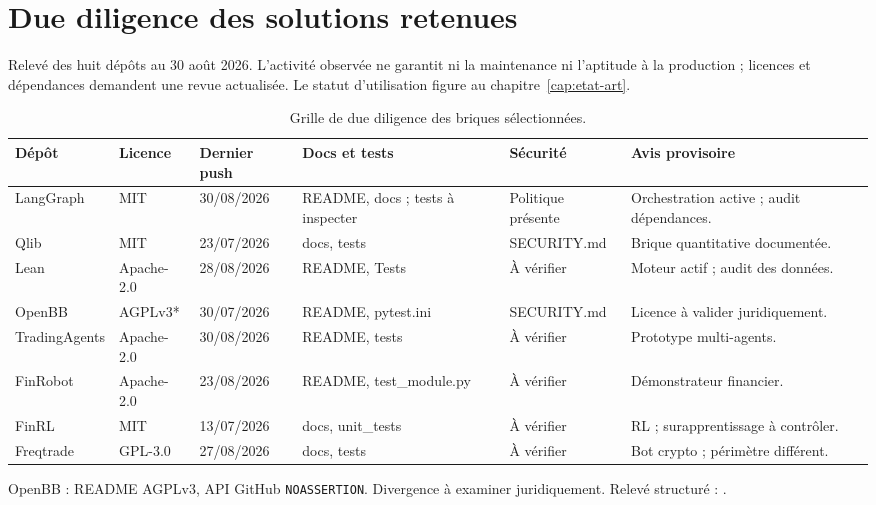 \chapter{Due diligence des solutions retenues}\label{annexe:github}

Relevé des huit dépôts au 30 août 2026. L'activité observée ne garantit ni la maintenance ni l'aptitude à la production ; licences et dépendances demandent une revue actualisée. Le statut d'utilisation figure au chapitre~\ref{cap:etat-art}.

\begin{table}[H]
\centering
\caption{Grille de due diligence des briques sélectionnées.}
\label{tab:due-diligence}
\scriptsize
\begin{adjustbox}{width=\textwidth}
\begin{tabular}{p{}p{}p{}p{}p{}p{}}
\toprule
\textbf{Dépôt} & \textbf{Licence} & \textbf{Dernier push} & \textbf{Docs et tests} & \textbf{Sécurité} & \textbf{Avis provisoire} \\
\midrule
LangGraph \citep{githubLangGraph} & MIT & 30/08/2026 & README, docs ; tests à inspecter & Politique présente & Orchestration active ; audit dépendances. \\
Qlib \citep{githubQlib} & MIT & 23/07/2026 & docs, tests & SECURITY.md & Brique quantitative documentée. \\
Lean \citep{githubLean} & Apache-2.0 & 28/08/2026 & README, Tests & À vérifier & Moteur actif ; audit des données. \\
OpenBB \citep{githubOpenBB} & AGPLv3* & 30/07/2026 & README, pytest.ini & SECURITY.md & Licence à valider juridiquement. \\
TradingAgents \citep{githubTradingAgents} & Apache-2.0 & 30/08/2026 & README, tests & À vérifier & Prototype multi-agents. \\
FinRobot \citep{githubFinRobot} & Apache-2.0 & 23/08/2026 & README, test\_module.py & À vérifier & Démonstrateur financier. \\
FinRL \citep{githubFinRL} & MIT & 13/07/2026 & docs, unit\_tests & À vérifier & RL ; surapprentissage à contrôler. \\
Freqtrade \citep{githubFreqtrade} & GPL-3.0 & 27/08/2026 & docs, tests & À vérifier & Bot crypto ; périmètre différent. \\
\bottomrule
\end{tabular}
\end{adjustbox}
\end{table}

\noindent * OpenBB : README AGPLv3, API GitHub \texttt{NOASSERTION}. Divergence à examiner juridiquement. Relevé structuré : .

